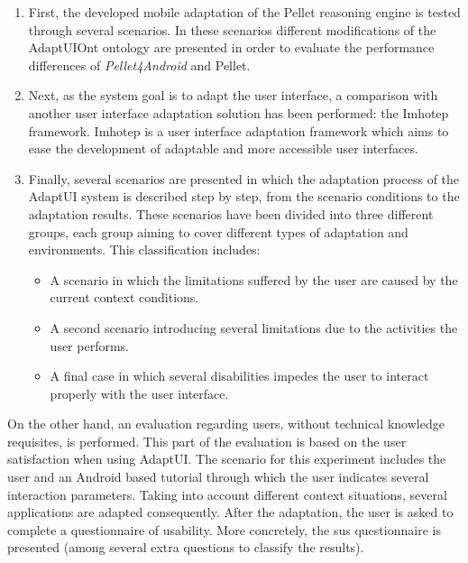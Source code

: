 \begin{enumerate}[label=\alph*)]
  \item First, the developed mobile adaptation of the Pellet reasoning engine 
  is tested through several scenarios. In these scenarios different   
  modifications of the AdaptUIOnt ontology are presented in order to evaluate 
  the performance differences of \textit{Pellet4Android} and Pellet.
  
  \item Next, as the system goal is to adapt the user interface, a comparison 
  with another user interface adaptation solution has been performed: the 
  Imhotep framework. Imhotep is a user interface adaptation framework which 
  aims to ease the development of adaptable and more accessible user 
  interfaces.
  
  \item Finally, several scenarios are presented in which the adaptation process
  of the AdaptUI system is described step by step, from the scenario conditions
  to the adaptation results. These scenarios have been divided into three 
  different groups, each group aiming to cover different types of adaptation 
  and environments. This classification includes:
  \begin{itemize}
    \item A scenario in which the limitations suffered by the user are caused
    by the current context conditions. 
    
    \item A second scenario introducing several limitations due to the  
    activities the user performs.
    
    \item A final case in which several disabilities impedes the user to 
    interact properly with the user interface.
  \end{itemize}
\end{enumerate}

On the other hand, an evaluation regarding users, without technical knowledge
requisites, is performed. This part of the evaluation is based on the user
satisfaction when using AdaptUI. The scenario for this experiment includes the
user and an Android based tutorial through which the user indicates several 
interaction parameters. Taking into account different context situations, 
several applications are adapted consequently. After the adaptation, the user 
is asked to complete a questionnaire of usability. More concretely, the \ac{sus} 
questionnaire is presented (among several extra questions to classify the 
results).

